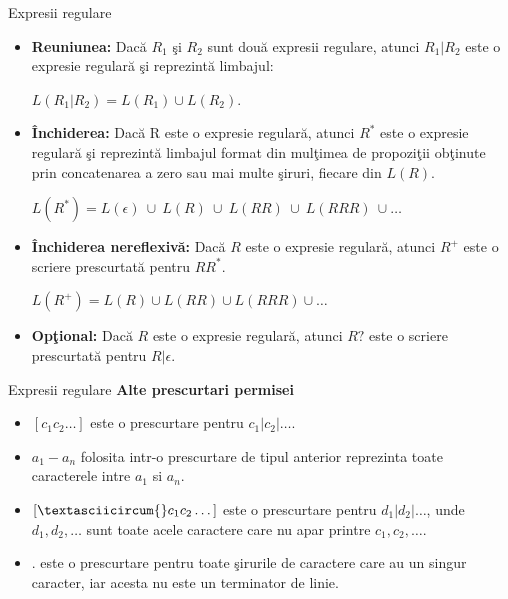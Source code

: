 \documentclass[pdf]{beamer}
\begin{document}
\begin{frame}{Expresii regulare}
\begin{itemize}
\item
\textbf{Reuniunea:} Dacă $R_1$ şi $R_2$ sunt două expresii regulare, atunci $R_1|R_2$ este o expresie regulară şi reprezintă limbajul:

\begin{center}
$L(R_1|R_2)=L(R_1) \cup L(R_2)$.
\end{center}
\item
\textbf{Închiderea:} Dacă R este o expresie regulară, atunci $R^*$ este o expresie regulară şi reprezintă limbajul format din mulţimea de propoziţii obţinute prin concatenarea a zero sau mai multe şiruri, fiecare din $L(R)$. 

\begin{center}
$L(R^*) = L(\epsilon)\ \cup \ L(R)\ \cup\ L(RR)\ \cup\ L(RRR)\ \cup \dots$
\end{center}
\item
\textbf{Închiderea nereflexivă:} Dacă $R$ este o expresie regulară, atunci $R^+$ este o scriere prescurtată pentru $RR^*$.

\begin{center}
$L(R^+) = L(R) \cup L(RR) \cup L(RRR) \cup \dots$
\end{center}
\item
\textbf{Opţional:} Dacă $R$ este o expresie regulară, atunci $R?$ este o scriere prescurtată pentru $R|\epsilon$.
\end{itemize}
\end{frame}

\begin{frame}{Expresii regulare}
\textbf{Alte prescurtari permisei}

\begin{itemize}
\item
$[ c_{1} c_{2} \dots]$  este o prescurtare pentru  $c_{1} | c_{2} | \dots $.
\item
$a_{1}-a_{n}$ folosita intr-o prescurtare de tipul anterior reprezinta toate caracterele intre $a_{1}$  si $  a_{n} $.
\item
$[ \textasciicircum{} c_{1} c_{2}\dots]$ este o prescurtare pentru $d_{1}|d_{2}|\dots$, unde$ d_{1}, d_{2}, \dots$ sunt toate acele caractere care nu apar printre $c_{1}, c_{2}, \dots$.
\item 
$.$ este o prescurtare pentru toate şirurile de caractere care au un singur caracter, iar acesta nu este un terminator de linie.
\end{itemize}
\end{frame}
\end{document}

